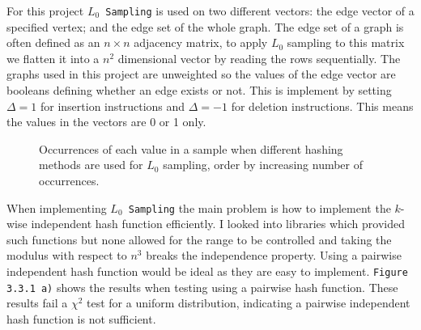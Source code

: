 \documentclass[11pt,twoside,a4paper]{report}
\begin{document}
For this project \texttt{$L_0$ Sampling} is used on two different vectors: the edge vector of a specified vertex; and the edge set of the whole graph. The edge set of a graph is often defined as an $n\times n$ adjacency matrix, to apply $L_0$ sampling to this matrix we flatten it into a $n^2$ dimensional vector by reading the rows sequentially. The graphs used in this project are unweighted so the values of the edge vector are booleans defining whether an edge exists or not. This is implement by setting $\Delta=1$ for insertion instructions and $\Delta=-1$ for deletion instructions. This means the values in the vectors are 0 or 1 only.

\begin{figure}[H]
	\label{Figure 13}
	\caption{Occurrences of each value in a sample when different hashing methods are used for $L_0$ sampling, order by increasing number of occurrences.}
\end{figure}
When implementing \texttt{$L_0$ Sampling} the main problem is how to implement the $k$-wise independent hash function efficiently. I looked into libraries which provided such functions but none allowed for the range to be controlled and taking the modulus with respect to $n^3$ breaks the independence property. Using a pairwise independent hash function would be ideal as they are easy to implement. \texttt{Figure 3.3.1 a)} shows the results when testing using a pairwise hash function. These results fail a $\chi^2$ test for a uniform distribution, indicating a pairwise independent hash function is not sufficient.
\end{document}
